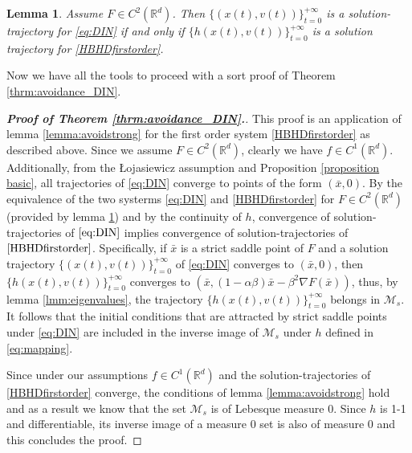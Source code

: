 \documentclass[reqno]{amsart}
\theoremstyle{plain}
\newtheorem{lemma}{Lemma}	%
\theoremstyle{definition}
\theoremstyle{remark}
\begin{document}
\begin{lemma}{\cite[Theorem $6.1$]{alvarez2002second}}
\label{lemma:equivalence}
    Assume $F\in C^2(\mathbb{R}^d)$.
    Then $\{(x(t),v(t))\}_{t=0}^{+\infty}$ is a solution-trajectory for \eqref{eq:DIN} if and only if $\{h(x(t),v(t))\}_{t=0}^{+\infty}$ is a solution trajectory for \eqref{HBHDfirstorder}.
\end{lemma}

Now we have all the tools to proceed with a sort proof of Theorem \ref{thrm:avoidance_DIN}.

\begin{proof}[\textbf{Proof of Theorem \ref{thrm:avoidance_DIN}.}]
    This proof is an application of lemma \ref{lemma:avoidstrong} for the first order system \eqref{HBHDfirstorder} as described above.
    Since we assume $F\in C^2(\mathbb{R}^d)$, clearly we have $f\in C^1(\mathbb{R}^d)$.
    Additionally, from the \L ojasiewicz assumption and Proposition \ref{proposition basic}, all trajectories of \eqref{eq:DIN} converge to points of the form $(\bar{x},0)$. 
    By the equivalence of the two systerms \eqref{eq:DIN} and \eqref{HBHDfirstorder} for $F\in C^2(\mathbb{R}^d)$ (provided by lemma \ref{lemma:equivalence}) and by the continuity of $h$, convergence of solution-trajectories of $\eqref{eq:DIN}$ implies convergence of solution-trajectories of $\eqref{HBHDfirstorder}$.
    Specifically, if $\bar{x}$ is a strict saddle point of $F$ and a solution trajectory $\{(x(t),v(t))\}_{t=0}^{+\infty}$ of \eqref{eq:DIN} converges to $(\bar{x},0)$, then $\{h(x(t),v(t))\}_{t=0}^{+\infty}$ converges to $(\bar{x},(1-\alpha\beta)\bar{x} - \beta^2\nabla F(\bar{x}))$, thus, by lemma \ref{lmm:eigenvalues}, the trajectory $\{h(x(t),v(t))\}_{t=0}^{+\infty}$ belongs in $\mathcal{M}_s$. 
    It follows that the initial conditions that are attracted by strict saddle points under \eqref{eq:DIN} are included in the inverse image of $\mathcal{M}_s$ under $h$ defined in \eqref{eq:mapping}. 

    Since under our assumptions $f\in C^1(\mathbb{R}^d)$ and the solution-trajectories of \eqref{HBHDfirstorder} converge, the conditions of lemma \ref{lemma:avoidstrong} hold and as a result we know that the set $\mathcal{M}_s$ is of Lebesque measure 0. 
    Since $h$ is 1-1 and differentiable, its inverse image of a measure 0 set is also of measure 0 and this concludes the proof.  
\end{proof} 
 



\end{document}
